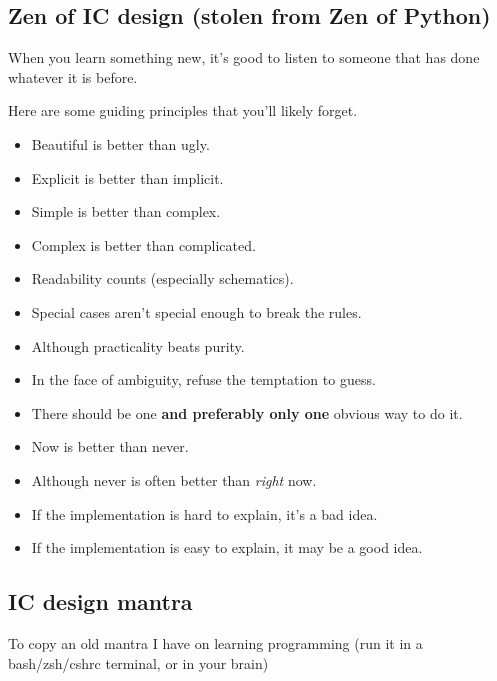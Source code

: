 \subsection{Zen of IC design (stolen from Zen of
Python)}\label{zen-of-ic-design-stolen-from-zen-of-python}

When you learn something new, it's good to listen to someone that has
done whatever it is before.

Here are some guiding principles that you'll likely forget.

\begin{itemize}
\item
  Beautiful is better than ugly.
\item
  Explicit is better than implicit.
\item
  Simple is better than complex.
\item
  Complex is better than complicated.
\item
  Readability counts (especially schematics).
\item
  Special cases aren't special enough to break the rules.
\item
  Although practicality beats purity.
\item
  In the face of ambiguity, refuse the temptation to guess.
\item
  There should be one \textbf{and preferably only one} obvious way to do
  it.
\item
  Now is better than never.
\item
  Although never is often better than \emph{right} now.
\item
  If the implementation is hard to explain, it's a bad idea.
\item
  If the implementation is easy to explain, it may be a good idea.
\end{itemize}

\subsection{IC design mantra}\label{ic-design-mantra}

To copy an old mantra I have on learning programming (run it in a
bash/zsh/cshrc terminal, or in your brain)

